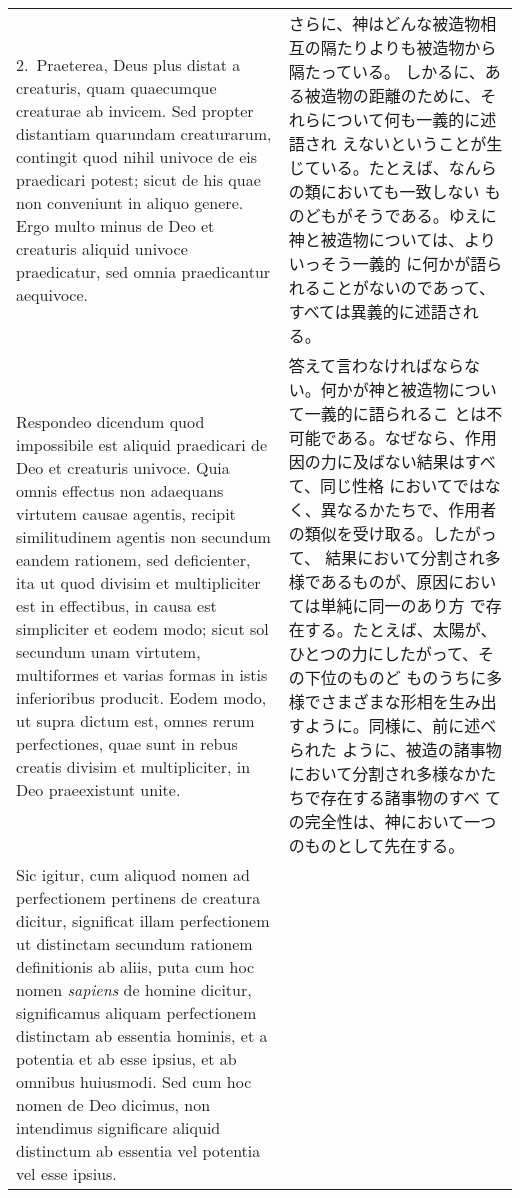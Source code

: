 \documentclass[10pt]{jsarticle} %
\begin{document}
\begin{longtable}{p{21em}p{21em}}
\\


2.~{\sc Praeterea}, Deus plus distat a creaturis, quam quaecumque
creaturae ab invicem. Sed propter distantiam quarundam creaturarum,
contingit quod nihil univoce de eis praedicari potest; sicut de his
quae non conveniunt in aliquo genere. Ergo multo minus de Deo et
creaturis aliquid univoce praedicatur, sed omnia praedicantur
aequivoce.

&

さらに、神はどんな被造物相互の隔たりよりも被造物から隔たっている。
しかるに、ある被造物の距離のために、それらについて何も一義的に述語され
えないということが生じている。たとえば、なんらの類においても一致しない
ものどもがそうである。ゆえに神と被造物については、よりいっそう一義的
に何かが語られることがないのであって、すべては異義的に述語される。

\\


{\sc Respondeo dicendum} quod impossibile est
 aliquid praedicari de Deo et creaturis univoce. Quia omnis effectus non
 adaequans virtutem causae agentis, recipit similitudinem agentis non
 secundum eandem rationem, sed deficienter, ita ut quod divisim et
 multipliciter est in effectibus, in causa est simpliciter et eodem
 modo; sicut sol secundum unam virtutem, multiformes et varias formas in
 istis inferioribus producit. Eodem modo, ut supra dictum est, omnes
 rerum perfectiones, quae sunt in rebus creatis divisim et
 multipliciter, in Deo praeexistunt unite. 

&

答えて言わなければならない。何かが神と被造物について一義的に語られるこ
とは不可能である。なぜなら、作用因の力に及ばない結果はすべて、同じ性格
においてではなく、異なるかたちで、作用者の類似を受け取る。したがって、
結果において分割され多様であるものが、原因においては単純に同一のあり方
で存在する。たとえば、太陽が、ひとつの力にしたがって、その下位のものど
ものうちに多様でさまざまな形相を生み出すように。同様に、前に述べられた
ように、被造の諸事物において分割され多様なかたちで存在する諸事物のすべ
ての完全性は、神において一つのものとして先在する。

\\

Sic igitur, cum aliquod nomen ad perfectionem pertinens de creatura
dicitur, significat illam perfectionem ut distinctam secundum rationem
definitionis ab aliis, puta cum hoc nomen {\it sapiens} de homine
dicitur, significamus aliquam perfectionem distinctam ab essentia
hominis, et a potentia et ab esse ipsius, et ab omnibus huiusmodi. Sed
cum hoc nomen de Deo dicimus, non intendimus significare aliquid
distinctum ab essentia vel potentia vel esse ipsius.



\end{longtable}
\end{document}
